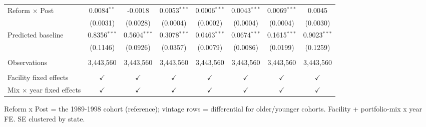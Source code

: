 \begin{tabular}{lccccccc}
   Reform $\times$ Post                                  & 0.0084$^{**}$  & -0.0018        & 0.0053$^{***}$                     & 0.0006$^{***}$                       & 0.0043$^{***}$                     & 0.0069$^{***}$  & 0.0045\\   
                                                         & (0.0031)       & (0.0028)       & (0.0004)                           & (0.0002)                             & (0.0004)                           & (0.0004)        & (0.0030)\\   
   Predicted baseline                                    & 0.8356$^{***}$ & 0.5604$^{***}$ & 0.3078$^{***}$                     & 0.0463$^{***}$                       & 0.0674$^{***}$                     & 0.1615$^{***}$  & 0.9023$^{***}$\\   
                                                         & (0.1146)       & (0.0926)       & (0.0357)                           & (0.0079)                             & (0.0086)                           & (0.0199)        & (0.1259)\\   
    \\
   Observations                                          & 3,443,560      & 3,443,560      & 3,443,560                          & 3,443,560                            & 3,443,560                          & 3,443,560       & 3,443,560\\  
    \\
   Facility fixed effects                                & $\checkmark$   & $\checkmark$   & $\checkmark$                       & $\checkmark$                         & $\checkmark$                       & $\checkmark$    & $\checkmark$\\   
   Mix $\times$ year fixed effects                       & $\checkmark$   & $\checkmark$   & $\checkmark$                       & $\checkmark$                         & $\checkmark$                       & $\checkmark$    & $\checkmark$\\   
   \bottomrule
\end{tabular}
 
\par \raggedright 
Reform x Post = the 1989-1998 cohort (reference); vintage rows = differential for older/younger cohorts. Facility + portfolio-mix x year FE. SE clustered by state.
\par\endgroup


